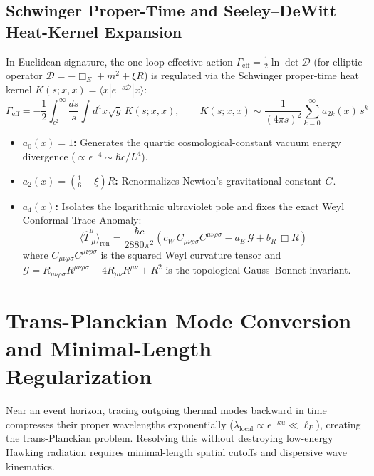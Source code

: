 \documentclass[11pt,a4paper]{article}
\begin{document}
\subsection{Schwinger Proper-Time and Seeley--DeWitt Heat-Kernel Expansion}
In Euclidean signature, the one-loop effective action $\Gamma_{\text{eff}} = \frac{1}{2} \ln \det \mathcal{D}$ (for elliptic operator $\mathcal{D} = -\Box_E + m^2 + \xi R$) is regulated via the Schwinger proper-time heat kernel $K(s; x, x) = \langle x | e^{-s\mathcal{D}} | x \rangle$:
\begin{equation}
\Gamma_{\text{eff}} = -\frac{1}{2} \int_{\epsilon^2}^{\infty} \frac{ds}{s} \int d^4x \sqrt{g}\, K(s; x, x), \qquad K(s; x, x) \sim \frac{1}{(4\pi s)^2} \sum_{k=0}^{\infty} a_{2k}(x)\, s^k
\end{equation}
\begin{itemize}[leftmargin=1.5em]
    \item \textbf{$a_0(x) = 1$:} Generates the quartic cosmological-constant vacuum energy divergence ($\propto \epsilon^{-4} \sim \hbar c / L^4$).
    \item \textbf{$a_2(x) = (\frac{1}{6} - \xi) R$:} Renormalizes Newton's gravitational constant $G$.
    \item \textbf{$a_4(x)$:} Isolates the logarithmic ultraviolet pole and fixes the exact Weyl Conformal Trace Anomaly:
    \begin{equation}
    \langle \hat{T}^\mu_{\;\mu} \rangle_{\text{ren}} = \frac{\hbar c}{2880\pi^2} \left( c_W\, C_{\mu\nu\rho\sigma} C^{\mu\nu\rho\sigma} - a_E\, \mathcal{G} + b_R\, \Box R \right)
    \end{equation}
    where $C_{\mu\nu\rho\sigma}C^{\mu\nu\rho\sigma}$ is the squared Weyl curvature tensor and $\mathcal{G} = R_{\mu\nu\rho\sigma}R^{\mu\nu\rho\sigma} - 4R_{\mu\nu}R^{\mu\nu} + R^2$ is the topological Gauss--Bonnet invariant.
\end{itemize}

\section{Trans-Planckian Mode Conversion and Minimal-Length Regularization}

Near an event horizon, tracing outgoing thermal modes backward in time compresses their proper wavelengths exponentially ($\lambda_{\text{local}} \propto e^{-\kappa u} \ll \ell_P$), creating the trans-Planckian problem. Resolving this without destroying low-energy Hawking radiation requires minimal-length spatial cutoffs and dispersive wave kinematics.
\end{document}
